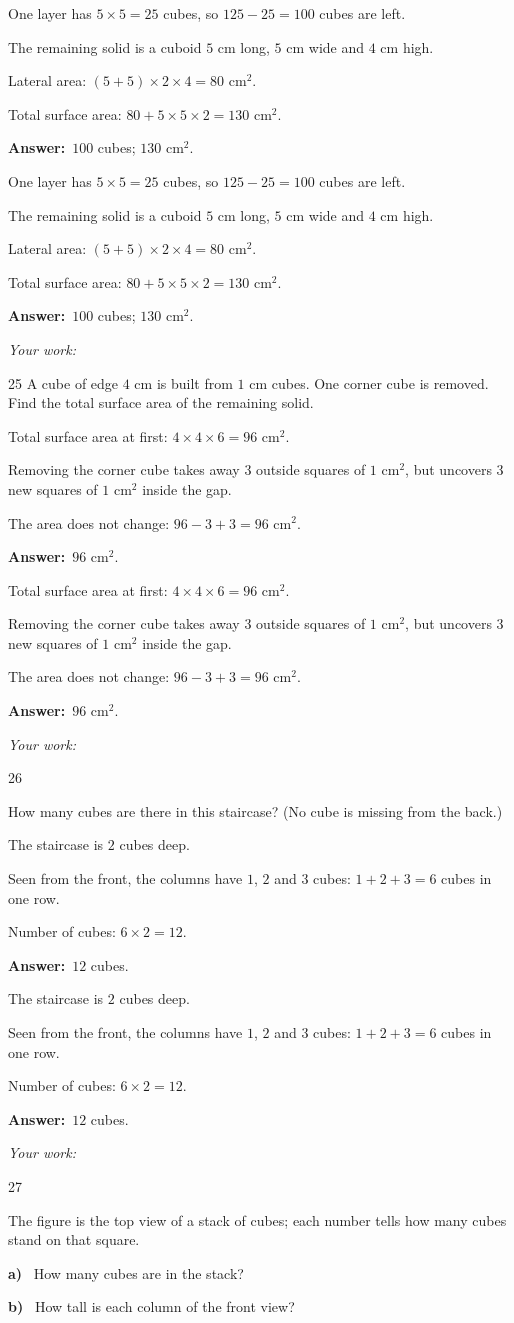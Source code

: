 \documentclass[11pt]{article}
\newif\ifsol \soltrue
\providecommand{\AnsWord}{Đáp số}
\newcommand{\dapso}[1]{\par\textbf{\AnsWord:}\ #1}
\newcommand{\probsol}[1]{%
  \begin{lrbox}{\solmeasure}\begin{minipage}{\dimexpr\linewidth-24pt\relax}#1\end{minipage}\end{lrbox}%
  \ifsol
    \begin{solbox}#1\end{solbox}%
  \else
    \setlength{\solht}{\dimexpr\ht\solmeasure+\dp\solmeasure+0.85cm\relax}%
    \ifdim\solht<1.35cm\setlength{\solht}{1.35cm}\fi
    \begin{tcolorbox}[colback=white,colframe=Line,boxrule=0.8pt,arc=5pt,
      left=8pt,right=8pt,top=4pt,bottom=4pt,height=\solht]{\footnotesize\color{Slate}\itshape\WorkWord}\end{tcolorbox}%
  \fi}
\newcommand{\pa}[1]{\textbf{#1)}\ }
\newcommand{\gap}{\vspace{0.3cm}}
\def\WorkWord{Your work:}
\def\AnsWord{Answer}
\begin{document}
\probsol{
One layer has $5\times5=25$ cubes, so $125-25=100$ cubes are left.\par
The remaining solid is a cuboid $5$ cm long, $5$ cm wide and $4$ cm high.\par
Lateral area: $(5+5)\times2\times4=80$ cm$^2$.\par
Total surface area: $80+5\times5\times2=130$ cm$^2$.
\dapso{$100$ cubes; $130$ cm$^2$.}}
\gap
\begin{probbox}{25}{\relax}
A cube of edge $4$ cm is built from $1$ cm cubes. One corner cube is removed. Find the total surface area of the remaining solid.
\end{probbox}
\probsol{
Total surface area at first: $4\times4\times6=96$ cm$^2$.\par
Removing the corner cube takes away $3$ outside squares of $1$ cm$^2$, but uncovers $3$ new squares of $1$ cm$^2$ inside the gap.\par
The area does not change: $96-3+3=96$ cm$^2$.
\dapso{$96$ cm$^2$.}}
\gap
\begin{probbox}{26}{\relax}
\begin{minipage}[t]{0.6\linewidth}
How many cubes are there in this staircase? (No cube is missing from the back.)
\end{minipage}\hfill
\begin{minipage}[t]{0.36\linewidth}\vspace{0pt}\centering
{}
\end{minipage}
\end{probbox}
\probsol{
The staircase is $2$ cubes deep.\par
Seen from the front, the columns have $1$, $2$ and $3$ cubes: $1+2+3=6$ cubes in one row.\par
Number of cubes: $6\times2=12$.
\dapso{$12$ cubes.}}
\gap
\begin{probbox}{27}{\relax}
\begin{minipage}[t]{0.6\linewidth}
The figure is the top view of a stack of cubes; each number tells how many cubes stand on that square.\par
\pa{a} How many cubes are in the stack?\par
\pa{b} How tall is each column of the front view?
\end{minipage}\hfill
\begin{minipage}[t]{0.36\linewidth}\vspace{0pt}\centering
{}
\end{minipage}
\end{probbox}
\end{document}
